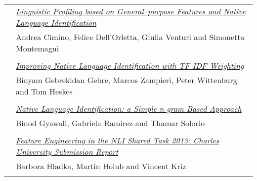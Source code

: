 \begin{tabular}{p{20mm}p{138mm}}
 & \hyperlink{page.207}{\em Linguistic Profiling based on General--purpose Features and Native Language Identification}\\
         & Andrea Cimino, Felice Dell'Orletta, Giulia Venturi and Simonetta Montemagni \\
\\

 & \hyperlink{page.216}{\em Improving Native Language Identification with TF-IDF Weighting}\\
         & Binyam Gebrekidan Gebre, Marcos Zampieri, Peter Wittenburg and Tom Heskes \\
\\

 & \hyperlink{page.224}{\em Native Language Identification: a Simple n-gram Based Approach}\\
         & Binod Gyawali, Gabriela Ramirez and Thamar Solorio \\
\\

 & \hyperlink{page.232}{\em Feature Engineering in the NLI Shared Task 2013: Charles University Submission Report}\\
         & Barbora Hladka, Martin Holub and Vincent Kriz \\
\\

\end{tabular}
\newpage
